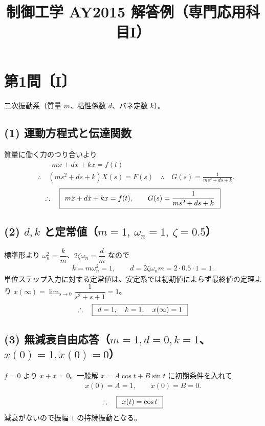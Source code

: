 \documentclass[11pt,a4paper]{article}
\title{制御工学 AY2015 解答例（専門応用科目I）}
\author{}
\date{}
\begin{document}
\maketitle

\section*{第1問〔I〕}

二次振動系（質量 $m$、粘性係数 $d$、バネ定数 $k$）。

\subsection*{(1) 運動方程式と伝達関数}
質量に働く力のつり合いより
\begin{align*}
  &\qquad m\ddot{x}+d\dot{x}+kx=f(t)\\
  &\therefore\quad (ms^2+ds+k)X(s)=F(s)
   \quad\therefore\quad G(s)=\frac{1}{ms^2+ds+k}.
\end{align*}
\[
  \therefore\quad \boxed{\,\;m\ddot{x}+d\dot{x}+kx=f(t),\qquad G(s)=\dfrac{1}{ms^2+ds+k}\;\,}
\]

\subsection*{(2) $d,k$ と定常値（$m=1,\ \omega_n=1,\ \zeta=0.5$）}
標準形より $\omega_n^2=\dfrac{k}{m}$、$2\zeta\omega_n=\dfrac{d}{m}$ なので
\begin{align*}
  &\qquad k=m\omega_n^2=1,\qquad d=2\zeta\omega_n m=2\cdot0.5\cdot1=1.
\end{align*}
単位ステップ入力に対する定常値は、安定系では初期値によらず最終値の定理より
$x(\infty)=\lim_{s\to0}\dfrac{1}{s^2+s+1}=1$。
\[
  \therefore\quad \boxed{\,\;d=1,\quad k=1,\quad x(\infty)=1\;\,}
\]

\subsection*{(3) 無減衰自由応答（$m=1,d=0,k=1$、$x(0)=1,\dot x(0)=0$）}
$f=0$ より $\ddot{x}+x=0$。一般解 $x=A\cos t+B\sin t$ に初期条件を入れて
\begin{align*}
  &\qquad x(0)=A=1,\qquad \dot{x}(0)=B=0.
\end{align*}
\[
  \therefore\quad \boxed{\,\;x(t)=\cos t\;\,}
\]
減衰がないので振幅 $1$ の持続振動となる。

\begin{center}
\end{center}
\end{document}
